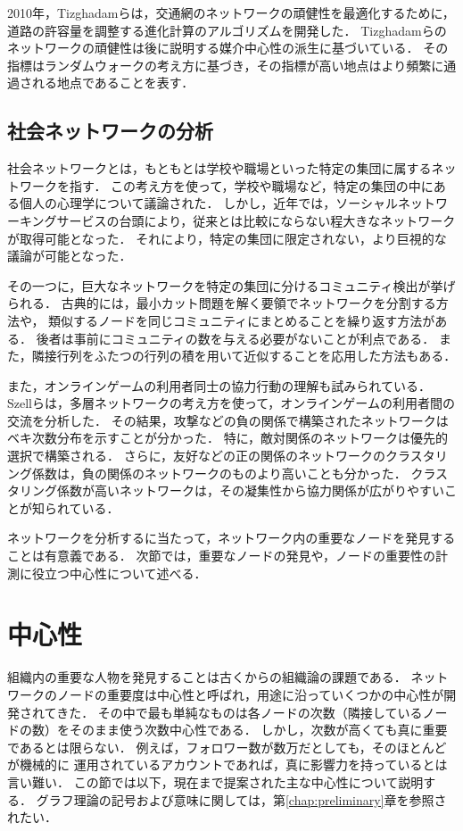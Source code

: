 2010年，Tizghadamらは，交通網のネットワークの頑健性を最適化するために，
道路の許容量を調整する進化計算のアルゴリズムを開発した\cite{Tizghadam2010}．
Tizghadamらのネットワークの頑健性は後に説明する媒介中心性の派生に基づいている．
その指標はランダムウォークの考え方に基づき，その指標が高い地点はより頻繁に通過される地点であることを表す．

\subsection{社会ネットワークの分析}

社会ネットワークとは，もともとは学校や職場といった特定の集団に属するネットワークを指す．
この考え方を使って，学校や職場など，特定の集団の中にある個人の心理学について議論された\cite{Moreno1978}．
しかし，近年では，ソーシャルネットワーキングサービスの台頭により，従来とは比較にならない程大きなネットワークが取得可能となった．
それにより，特定の集団に限定されない，より巨視的な議論が可能となった．

その一つに，巨大なネットワークを特定の集団に分けるコミュニティ検出\cite{Fortunato2010}が挙げられる．
古典的には，最小カット問題を解く要領でネットワークを分割する方法や，
類似するノードを同じコミュニティにまとめることを繰り返す方法がある．
後者は事前にコミュニティの数を与える必要がないことが利点である．
また，隣接行列をふたつの行列の積を用いて近似することを応用した方法\cite{Wang2011}もある．

また，オンラインゲームの利用者同士の協力行動の理解も試みられている．
Szellらは，多層ネットワークの考え方を使って，オンラインゲームの利用者間の交流を分析した\cite{Szell2010}．
その結果，攻撃などの負の関係で構築されたネットワークはベキ次数分布を示すことが分かった．
特に，敵対関係のネットワークは優先的選択\cite{Barabasi1999}で構築される．
さらに，友好などの正の関係のネットワークのクラスタリング係数は，負の関係のネットワークのものより高いことも分かった．
クラスタリング係数が高いネットワークは，その凝集性から協力関係が広がりやすいことが知られている．

ネットワークを分析するに当たって，ネットワーク内の重要なノードを発見することは有意義である．
次節では，重要なノードの発見や，ノードの重要性の計測に役立つ中心性について述べる．

\section{中心性}
\label{sect:centrality}

組織内の重要な人物を発見することは古くからの組織論の課題である\cite{Christie1952,Ibarra1993}．
ネットワークのノードの重要度は中心性と呼ばれ，用途に沿っていくつかの中心性が開発されてきた．
その中で最も単純なものは各ノードの次数（隣接しているノードの数）をそのまま使う次数中心性である．
しかし，次数が高くても真に重要であるとは限らない．
例えば，フォロワー数が数万だとしても，そのほとんどが機械的に
運用されているアカウントであれば，真に影響力を持っているとは言い難い．
この節では以下，現在まで提案された主な中心性について説明する．
グラフ理論の記号および意味に関しては，第\ref{chap:preliminary}章を参照されたい．

